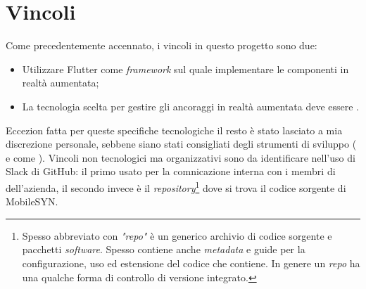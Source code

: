 \section{Vincoli}
Come precedentemente accennato, i vincoli in questo progetto sono due: 
\begin{itemize}
    \item Utilizzare Flutter come \textit{framework} sul quale implementare le componenti in realtà aumentata;
    \item La tecnologia scelta per gestire gli ancoraggi in realtà aumentata deve essere \asa{}.
\end{itemize}
Eccezion fatta per queste specifiche tecnologiche il resto è stato lasciato a mia discrezione personale, sebbene siano stati consigliati degli strumenti di sviluppo (\vsc{} e \astudio{} come \ide{}). 
Vincoli non tecnologici ma organizzativi sono da identificare nell'uso di Slack di GitHub: il primo usato per la comnicazione interna con i membri di dell'azienda, il secondo invece è il \textit{repository}\footnote{Spesso abbreviato con \textit{"repo"} è un generico archivio di codice sorgente e pacchetti \textit{software}. Spesso contiene anche \textit{metadata} e guide per la configurazione, uso ed estensione del codice che contiene. In genere un \textit{repo} ha una qualche forma di controllo di versione integrato.} dove si trova il codice sorgente di MobileSYN.


